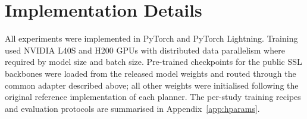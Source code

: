 \section{Implementation Details}
\label{sec:meth-implementation}

All experiments were implemented in PyTorch and PyTorch Lightning. Training used NVIDIA L40S and H200 GPUs with distributed data parallelism where required by model size and batch size. Pre-trained checkpoints for the public SSL backbones were loaded from the released model weights and routed through the common adapter described above; all other weights were initialised following the original reference implementation of each planner. The per-study training recipes and evaluation protocols are summarised in Appendix~\ref{app:hparams}.

